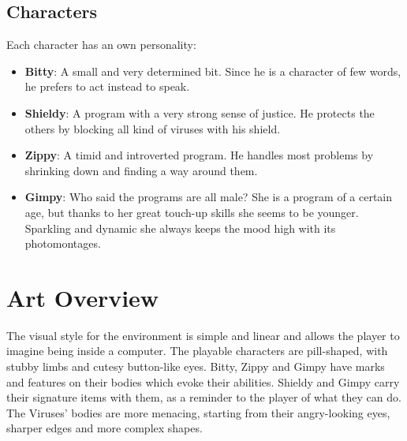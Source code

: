 \documentclass[12pt, a4paper]{report}
\begin{document}
\section*{Characters}
Each character has an own personality:
\begin{itemize}
\item \textbf{Bitty}: A small and very determined bit. Since he is a character of few words, he prefers to act instead to speak.
\item \textbf{Shieldy}: A program with a very strong sense of justice. He protects the others by blocking all kind of viruses with his shield.
\item \textbf{Zippy}: A timid and introverted program. He handles most problems by shrinking down and finding a way around them.
\item \textbf{Gimpy}: Who said the programs are all male? She is a program of a certain age, but thanks to her great touch-up skills she seems to be younger. Sparkling and dynamic she always keeps the mood high with its photomontages.
\end{itemize}

\chapter{Art Overview}
The visual style for the environment is simple and linear and allows the player to imagine being inside a computer.
The playable characters are pill-shaped, with stubby limbs and cutesy button-like eyes. Bitty, Zippy and Gimpy have marks and features on their bodies which evoke their abilities. Shieldy and Gimpy carry their signature items with them, as a reminder to the player of what they can do.\\
The Viruses' bodies are more menacing, starting from their angry-looking eyes, sharper edges and more complex shapes.\\
\end{document}
